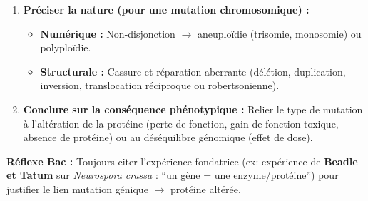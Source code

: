 \documentclass[11pt]{article}
\begin{document}
\begin{methode}
\begin{enumerate}
\begin{itemize}
              \end{itemize}
        \item \textbf{Préciser la nature (pour une mutation chromosomique) :}
              \begin{itemize}
                  \item \textbf{Numérique :} Non-disjonction $\rightarrow$ aneuploïdie (trisomie, monosomie) ou polyploïdie.
                  \item \textbf{Structurale :} Cassure et réparation aberrante (délétion, duplication, inversion, translocation réciproque ou robertsonienne).
              \end{itemize}
        \item \textbf{Conclure sur la conséquence phénotypique :} Relier le type de mutation à l'altération de la protéine (perte de fonction, gain de fonction toxique, absence de protéine) ou au déséquilibre génomique (effet de dose).
    \end{enumerate}
    \textbf{Réflexe Bac :} Toujours citer l'expérience fondatrice (ex: expérience de \textbf{Beadle et Tatum} sur \emph{Neurospora crassa} : ``un gène = une enzyme/protéine'') pour justifier le lien mutation génique $\rightarrow$ protéine altérée.
\end{methode}
\end{document}
